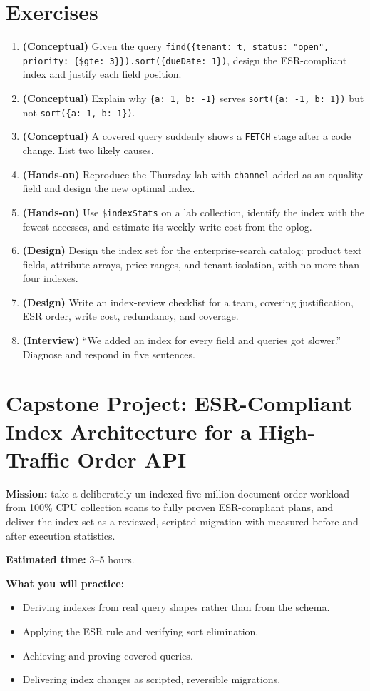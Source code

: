 \section{Exercises}
\begin{enumerate}
    \item \textbf{(Conceptual)} Given the query \texttt{find(\{tenant: t, status: "open", priority: \{\$gte: 3\}\}).sort(\{dueDate: 1\})}, design the ESR-compliant index and justify each field position.
    \item \textbf{(Conceptual)} Explain why \texttt{\{a: 1, b: -1\}} serves \texttt{sort(\{a: -1, b: 1\})} but not \texttt{sort(\{a: 1, b: 1\})}.
    \item \textbf{(Conceptual)} A covered query suddenly shows a \texttt{FETCH} stage after a code change. List two likely causes.
    \item \textbf{(Hands-on)} Reproduce the Thursday lab with \texttt{channel} added as an equality field and design the new optimal index.
    \item \textbf{(Hands-on)} Use \texttt{\$indexStats} on a lab collection, identify the index with the fewest accesses, and estimate its weekly write cost from the oplog.
    \item \textbf{(Design)} Design the index set for the enterprise-search catalog: product text fields, attribute arrays, price ranges, and tenant isolation, with no more than four indexes.
    \item \textbf{(Design)} Write an index-review checklist for a team, covering justification, ESR order, write cost, redundancy, and coverage.
    \item \textbf{(Interview)} ``We added an index for every field and queries got slower.'' Diagnose and respond in five sentences.
\end{enumerate}

\section{Capstone Project: ESR-Compliant Index Architecture for a High-Traffic Order API}\label{sec:ch9-capstone}

\begin{capstonebox}
\textbf{Mission:} take a deliberately un-indexed five-million-document order workload from 100\% CPU collection scans to fully proven ESR-compliant plans, and deliver the index set as a reviewed, scripted migration with measured before-and-after execution statistics.

\textbf{Estimated time:} 3--5 hours.

\textbf{What you will practice:}
\begin{itemize}
    \item Deriving indexes from real query shapes rather than from the schema.
    \item Applying the ESR rule and verifying sort elimination.
    \item Achieving and proving covered queries.
    \item Delivering index changes as scripted, reversible migrations.
\end{itemize}
\end{capstonebox}

